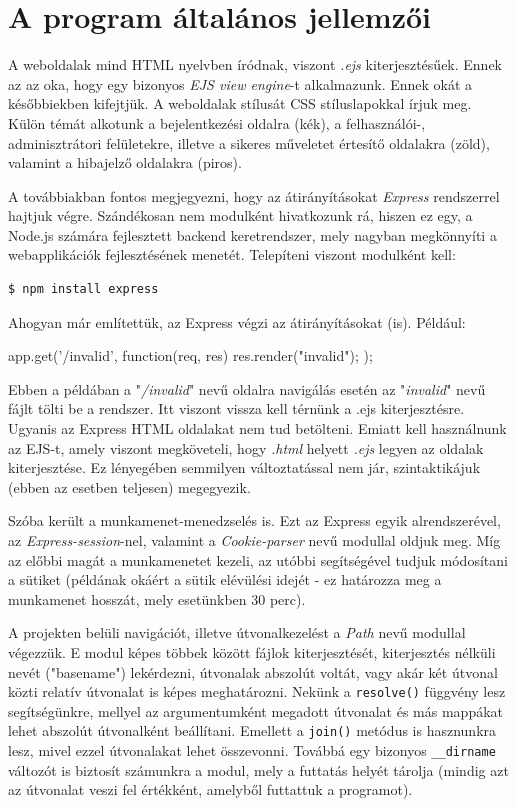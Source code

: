 \section{A program általános jellemzői}

A weboldalak mind HTML nyelvben íródnak, viszont \textit{.ejs} kiterjesztésűek. Ennek az az oka, hogy egy bizonyos \textit{EJS view engine}-t alkalmazunk. Ennek okát a későbbiekben kifejtjük. A weboldalak stílusát CSS stíluslapokkal írjuk meg. Külön témát alkotunk a bejelentkezési oldalra (kék), a felhasználói-, adminisztrátori felületekre, illetve a sikeres műveletet értesítő oldalakra (zöld), valamint a hibajelző oldalakra (piros).

A továbbiakban fontos megjegyezni, hogy az átirányításokat \textit{Express} rendszerrel hajtjuk végre. Szándékosan nem modulként hivatkozunk rá, hiszen ez egy, a Node.js számára fejlesztett backend keretrendszer, mely nagyban megkönnyíti a webapplikációk fejlesztésének menetét. Telepíteni viszont modulként kell:

\begin{verbatim}
$ npm install express
\end{verbatim}

Ahogyan már említettük, az Express végzi az átirányításokat (is). Például:

\begin{javascript}
app.get('/invalid', function(req, res) {
  res.render("invalid");
});
\end{javascript}

Ebben a példában a "\textit{/invalid}" nevű oldalra navigálás esetén az "\textit{invalid}" nevű fájlt tölti be a rendszer. Itt viszont vissza kell térnünk a .ejs kiterjesztésre. Ugyanis az Express HTML oldalakat nem tud betölteni. Emiatt kell használnunk az EJS-t, amely viszont megköveteli, hogy \textit{.html} helyett \textit{.ejs} legyen az oldalak kiterjesztése. Ez lényegében semmilyen változtatással nem jár, szintaktikájuk (ebben az esetben teljesen) megegyezik.

Szóba került a munkamenet-menedzselés is. Ezt az Express egyik alrendszerével, az \textit{Express-session}-nel, valamint a \textit{Cookie-parser} nevű modullal oldjuk meg. Míg az előbbi magát a munkamenetet kezeli, az utóbbi segítségével tudjuk módosítani a sütiket (példának okáért a sütik elévülési idejét - ez határozza meg a munkamenet hosszát, mely esetünkben 30 perc).

A projekten belüli navigációt, illetve útvonalkezelést a \textit{Path} nevű modullal végezzük. E modul képes többek között fájlok kiterjesztését, kiterjesztés nélküli nevét ("basename") lekérdezni, útvonalak abszolút voltát, vagy akár két útvonal közti relatív útvonalat is képes meghatározni. Nekünk a \texttt{resolve()} függvény lesz segítségünkre, mellyel az argumentumként megadott útvonalat és más mappákat lehet abszolút útvonalként beállítani. Emellett a \texttt{join()} metódus is hasznunkra lesz, mivel ezzel útvonalakat lehet összevonni. Továbbá egy bizonyos \texttt{\_\_dirname} változót is biztosít számunkra a modul, mely a futtatás helyét tárolja (mindig azt az útvonalat veszi fel értékként, amelyből futtattuk a programot).

